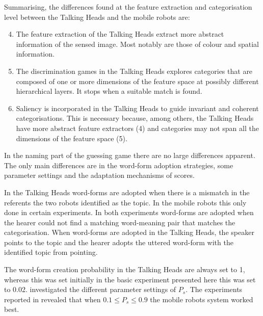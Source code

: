 Summarising, the differences found at the feature extraction and categorisation level between the Talking Heads and the mobile robots are:

\begin{enumerate}
\setcounter{enumi}{3}
\item The feature extraction of the Talking Heads extract more abstract information of the sensed image. Most notably are those of colour and spatial information.
\item The discrimination games in the Talking Heads explores categories that are composed of one or more dimensions of the feature space at possibly different hierarchical layers. It stops when a suitable match is found.
\item Saliency is incorporated in the Talking Heads to guide invariant and coherent categorisations. This is necessary because, among others, the Talking Heads have more abstract feature extractors (4) and categories may not span all the dimensions of the feature space (5).
\end{enumerate}

In the naming part of the guessing game there are no large differences apparent. The only main differences are in the word-form adoption strategies, some parameter settings and the adaptation mechanisms of scores.

In the Talking Heads word-forms are adopted when there is a mismatch in the referents the two robots identified as the topic. In the mobile robots this only done in certain experiments. In both experiments word-forms are adopted when the hearer could not find a matching word-meaning pair that matches the categorisation. When word-forms are adopted in the Talking Heads, the speaker points to the topic and the hearer adopts the uttered word-form with the identified topic from pointing.

The word-form creation probability in the Talking Heads are always set to 1, whereas this was set initially in the basic experiment presented here this was set to 0.02. \citet{kaplan:2000} investigated the different parameter settings of $P_s$. The experiments reported in  revealed that when $0.1 \leq P_s\leq 0.9$ the mobile robots system worked best.

